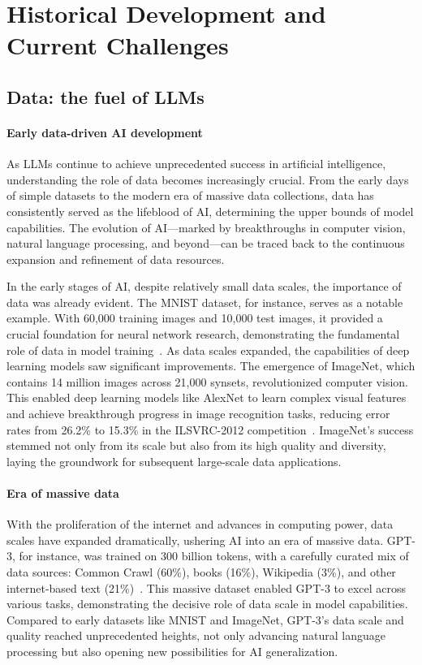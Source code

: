 \section{Historical Development and Current Challenges}\label{sec:history}

\subsection{Data: the fuel of LLMs}

\paragraph{Early data-driven AI development}
As LLMs continue to achieve unprecedented success in artificial intelligence, understanding the role of data becomes increasingly crucial. From the early days of simple datasets to the modern era of massive data collections, data has consistently served as the lifeblood of AI, determining the upper bounds of model capabilities. The evolution of AI—marked by breakthroughs in computer vision, natural language processing, and beyond—can be traced back to the continuous expansion and refinement of data resources. 

In the early stages of AI, despite relatively small data scales, the importance of data was already evident. The MNIST dataset, for instance, serves as a notable example. With 60,000 training images and 10,000 test images, it provided a crucial foundation for neural network research, demonstrating the fundamental role of data in model training~\cite{lecun1998mnist}. As data scales expanded, the capabilities of deep learning models saw significant improvements. The emergence of ImageNet, which contains 14 million images across 21,000 synsets, revolutionized computer vision. This enabled deep learning models like AlexNet to learn complex visual features and achieve breakthrough progress in image recognition tasks, reducing error rates from 26.2\% to 15.3\% in the ILSVRC-2012 competition~\cite{deng2009imagenet,krizhevsky2012imagenet}. ImageNet's success stemmed not only from its scale but also from its high quality and diversity, laying the groundwork for subsequent large-scale data applications.

\paragraph{Era of massive data}
With the proliferation of the internet and advances in computing power, data scales have expanded dramatically, ushering AI into an era of massive data. GPT-3, for instance, was trained on 300 billion tokens, with a carefully curated mix of data sources: Common Crawl (60\%), books (16\%), Wikipedia (3\%), and other internet-based text (21\%)~\cite{brown2020language}. This massive dataset enabled GPT-3 to excel across various tasks, demonstrating the decisive role of data scale in model capabilities. Compared to early datasets like MNIST and ImageNet, GPT-3's data scale and quality reached unprecedented heights, not only advancing natural language processing but also opening new possibilities for AI generalization.


